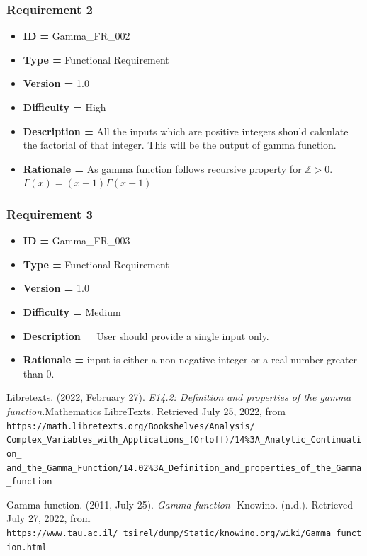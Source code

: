 \documentclass[12pt]{report}
\begin{document}
\subsubsection{Requirement 2}
\begin{itemize}
    \item \textbf{ID = }Gamma\_FR\_002
    \item \textbf{Type = }Functional Requirement
    \item \textbf{Version = } 1.0
    \item \textbf{Difficulty = }High
    \item \textbf{Description = } All the inputs which are positive integers should calculate the factorial of that integer. This will be the output of gamma function.
    \item \textbf{Rationale = }As gamma function follows recursive property for $\mathbb{Z}>0.$ $\Gamma(x)=(x-1)\Gamma(x-1)$
\end{itemize}

\subsubsection{Requirement 3}
\begin{itemize}
    \item \textbf{ID = }Gamma\_FR\_003
    \item \textbf{Type = }Functional Requirement
    \item \textbf{Version = } 1.0
    \item \textbf{Difficulty = }Medium
    \item \textbf{Description = } User should provide a single input only.
    \item \textbf{Rationale = }input is either a non-negative integer or a real number greater than 0.
\end{itemize}

\begin{thebibliography}{9}
Libretexts. (2022, February 27). \textit{E14.2: Definition and properties of the gamma function.}Mathematics LibreTexts. Retrieved July 25, 2022, from \texttt{https://math.libretexts.org/Bookshelves/Analysis/\\Complex\_Variables\_with\_Applications\_(Orloff)/14\%3A\_Analytic\_Continuation\_\\and\_the\_Gamma\_Function/14.02\%3A\_Definition\_and\_properties\_of\_the\_Gamma\_function}

Gamma function. (2011, July 25). \textit{Gamma function}- Knowino. (n.d.). Retrieved July 27, 2022, from\\ \texttt{https://www.tau.ac.il/~tsirel/dump/Static/knowino.org/wiki/Gamma\_function.html}

\end{thebibliography}
\end{document}
